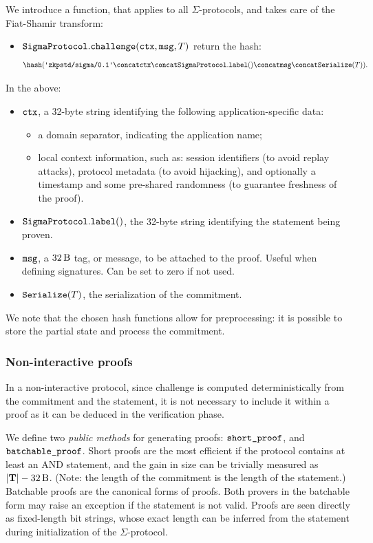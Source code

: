 \documentclass[11pt]{article}
\begin{document}
We introduce a function, that applies to all $\Sigma$-protocols, and takes care of the Fiat-Shamir transform:
\begin{itemize}
  \item $\texttt{SigmaProtocol}.\texttt{challenge}(\texttt{ctx}, \texttt{msg}, T)$
  return the hash:\[
    \hash(\domsepctx \concat \ctx \concat \sigmaprotocol.\labeltt() \concat \msg \concat  \serialize(\commitment)).
    \]
\end{itemize}
In the above:
\begin{itemize}[label=$-$]
  \item $\texttt{ctx}$, a 32-byte string identifying the following application-specific data:
  \begin{itemize}
    \item a domain separator, indicating the application name;
    \item local context information, such as:
    session identifiers (to avoid replay attacks), protocol metadata (to avoid hijacking), and optionally a timestamp and some pre-shared randomness (to guarantee freshness of the proof).
  \end{itemize}
  \item $\texttt{SigmaProtocol}.\texttt{label}()$, the 32-byte string identifying the statement being proven.
  \item $\texttt{msg}$, a $\seedlen$ tag, or message, to be attached to the proof.
  Useful when defining signatures. Can be set to zero if not used.
  \item $\texttt{Serialize}(T)$, the serialization of the commitment.
\end{itemize}

We note that the chosen hash functions allow for preprocessing: it is possible to store the partial state and process the commitment.


\subsubsection{Non-interactive proofs}

In a non-interactive protocol, since challenge is computed deterministically from the commitment and the statement, it is not necessary to include it within a proof as it can be deduced in the verification phase.

We define two \emph{public methods} for generating proofs: $\texttt{short\_proof}$, and $\texttt{batchable\_proof}$.
Short proofs are the most efficient if the protocol contains at least an AND statement, and the gain in size can be trivially measured as $|\vec \commitment| - \seedlen$.
(Note: the length of the commitment is the length of the statement.)
Batchable proofs are the canonical forms of proofs.
Both provers in the batchable form may raise an exception if the statement is not valid.
Proofs are seen directly as fixed-length bit strings, whose exact length can be inferred from the statement during initialization of the $\Sigma$-protocol.
\end{document}
